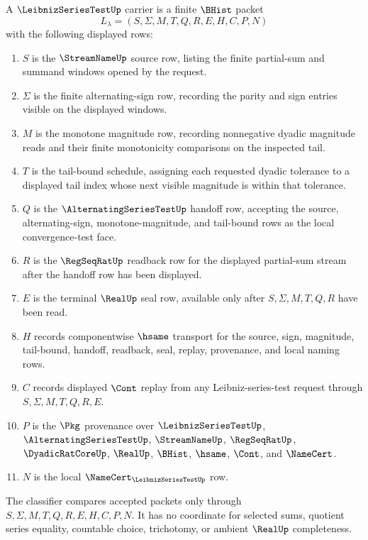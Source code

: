 \begin{definition}
\label{def:leibniz-series-test-carrier}
A $\LeibnizSeriesTestUp$ carrier is a finite $\BHist$ packet
$$
L_{\lambda}=(S,\Sigma,M,T,Q,R,E,H,C,P,N)
$$
with the following displayed rows:
\begin{enumerate}
\item $S$ is the $\StreamNameUp$ source row, listing the finite partial-sum and summand windows opened by the request.
\item $\Sigma$ is the finite alternating-sign row, recording the parity and sign entries visible on the displayed windows.
\item $M$ is the monotone magnitude row, recording nonnegative dyadic magnitude reads and their finite monotonicity comparisons on the inspected tail.
\item $T$ is the tail-bound schedule, assigning each requested dyadic tolerance to a displayed tail index whose next visible magnitude is within that tolerance.
\item $Q$ is the $\AlternatingSeriesTestUp$ handoff row, accepting the source, alternating-sign, monotone-magnitude, and tail-bound rows as the local convergence-test face.
\item $R$ is the $\RegSeqRatUp$ readback row for the displayed partial-sum stream after the handoff row has been displayed.
\item $E$ is the terminal $\RealUp$ seal row, available only after $S,\Sigma,M,T,Q,R$ have been read.
\item $H$ records componentwise $\hsame$ transport for the source, sign, magnitude, tail-bound, handoff, readback, seal, replay, provenance, and local naming rows.
\item $C$ records displayed $\Cont$ replay from any Leibniz-series-test request through $S,\Sigma,M,T,Q,R,E$.
\item $P$ is the $\Pkg$ provenance over $\LeibnizSeriesTestUp$, $\AlternatingSeriesTestUp$, $\StreamNameUp$, $\RegSeqRatUp$, $\DyadicRatCoreUp$, $\RealUp$, $\BHist$, $\hsame$, $\Cont$, and $\NameCert$.
\item $N$ is the local $\NameCert_{\LeibnizSeriesTestUp}$ row.
\end{enumerate}
The classifier compares accepted packets only through $S,\Sigma,M,T,Q,R,E,H,C,P,N$. It has no coordinate for selected sums, quotient series equality, countable choice, trichotomy, or ambient $\RealUp$ completeness.
\end{definition}

